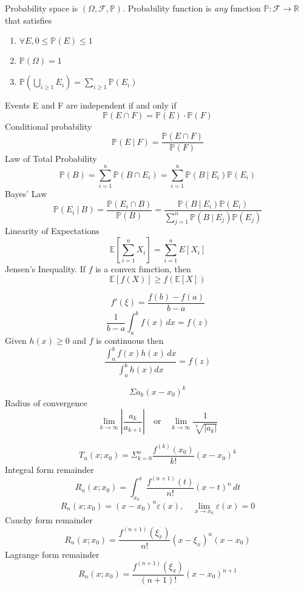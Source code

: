 \documentclass[10pt,landscape,a4paper]{article}
\newenvironment{topic}[1]
{\begin{mdframed}[
    linecolor=black,
    frametitle=#1,
    frametitlebackgroundcolor=black!5,
  ]}
{\end{mdframed}}
\newcommand{\prob}{\mathbb{P}}
\newcommand{\E}{\mathbb{E}}
\newcommand{\F}{\mathcal{F}}
\newcommand{\R}{\mathbb{R}}
\newcommand{\given}{\: \vert \:}
\newcommand{\dx}[1][x]{\,d#1}
\newcommand{\abint}{\int_a^b}
\newcommand{\inftylim}[1]{\lim_{#1 \rightarrow \infty}}
\newcommand{\summation}[1][i = 1]{\sum_{#1}^{n}}
\begin{document}
\thispagestyle{empty}

\begin{multicols}{3}

  \begin{topic}{Probability}
    Probability space is $(\Omega, \F, \prob)$.
    Probability function is \emph{any} function $\prob : \F \rightarrow \R$
    that satisfies
    \begin{enumerate}
      \item $\forall E, 0 \leq \prob(E) \leq 1$
      \item $\prob(\Omega) = 1$
      \item $\prob \left( \bigcup\limits_{i \geq 1} E_i \right)
        = \sum\limits_{i \geq 1} \prob(E_i)$
    \end{enumerate}
    Events E and F are independent if and only if
    \[
      \prob(E \cap F) = \prob(E) \cdot \prob(F)
    \]
    Conditional probability
    \[
      \prob(E \given F) = \frac{\prob(E \cap F)}{\prob(F)}
    \]
    Law of Total Probability
    \[
      \prob(B)
      = \summation \prob(B \cap E_i)
      = \summation \prob(B \given E_i) \prob(E_i)
    \]
    Bayes' Law
    \[
      \prob(E_i \given B)
      = \frac{\prob(E_i \cap B)}{\prob(B)}
      = \frac{\prob(B \given E_i) \prob(E_i)}
      {\summation[j = 1] \prob(B \given E_j) \prob(E_j)}
    \]
    Linearity of Expectations
    \[
      \E \left[ \sum_{i = 1}^n X_i \right]
      = \sum_{i = 1}^n E[X_i]
    \]
    Jensen's Inequality. If $f$ is a convex function, then
    \[
      \E[ f(X) ] \geq f( \E[X] )
    \]
  \end{topic}

  \begin{topic}{Intermediate value}{
      \[
        f'(\xi) = \frac{f(b) - f(a)}{b - a}
      \]
      \[
        \frac{1}{b - a} \abint f(x) \dx = f(z)
      \]
      Given $h(x) \geq 0$ and $f$ is continuous then
      \[
        \frac{\abint f(x)h(x) \dx}{ \abint h(x) dx}
        = f(z)
      \]
  }\end{topic}

  \begin{topic}{Power series}{
      \[
        \Sigma a_k (x - x_0)^k
      \]
      Radius of convergence
      \[
        \inftylim{k} \left| \frac{a_k}{a_{k+1}} \right|
        \quad\text{or}\quad
        \inftylim{k} \frac{1}{\sqrt[k]{|a_k|}}
      \]
  }\end{topic}

  \begin{topic}{Taylor's theorem}{
      \[
        T_n(x; x_0) = \Sigma_{k=0}^n \frac{f^{(k)}(x_0)}{k!} (x-x_0)^k
      \]
      Integral form remainder
      \[
        R_n(x; x_0)
        = \int_{x_0}^x \frac{f^{(n+1)}(t)}{n!} (x-t)^n \dx[t]
      \]
      \[
        R_n(x; x_0) = (x - x_0)^n \varepsilon(x),
        \quad \lim_{x \rightarrow x_0} \varepsilon(x) = 0
      \]
      Cauchy form remainder
      \[
        R_n(x; x_0)
        = \frac{ f^{(n+1)}(\xi_x) }{n!} (x - \xi_x)^n (x - x_0)
      \]
      Lagrange form remainder
      \[
        R_n(x; x_0)
        = \frac{ f^{(n+1)}(\xi_x) }{ (n + 1)! } (x - x_0)^{n+1}
      \]
  }\end{topic}

\end{multicols}
\end{document}

